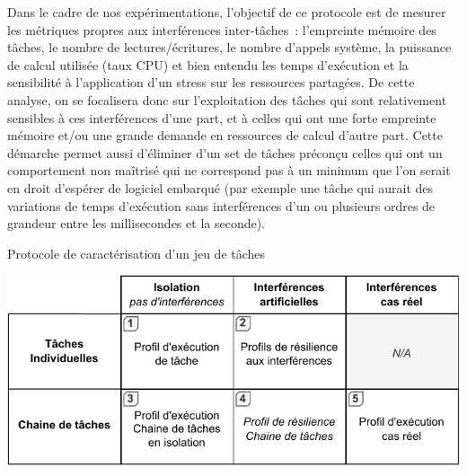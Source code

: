 \documentclass[french, a4paper, 11pt, twoside, pdftex]{StyleThese}
\begin{document}
        Dans le cadre de nos expérimentations, l'objectif de ce protocole est de mesurer les métriques propres aux interférences inter-tâches~: l'empreinte mémoire des tâches, le nombre de lectures/écritures, le nombre d'appels système, la puissance de calcul utilisée (taux CPU) et bien entendu les temps d'exécution et la sensibilité à l'application d'un stress sur les ressources partagées. De cette analyse, on se focalisera donc sur l'exploitation des tâches qui sont relativement sensibles à ces interférences d'une part, et à celles qui ont une forte empreinte mémoire et/ou une grande demande en ressources de calcul d'autre part. Cette démarche permet aussi d'éliminer d'un set de tâches préconçu celles qui ont un comportement non maîtrisé qui ne correspond pas à un minimum que l'on serait en droit d'espérer de logiciel embarqué (par exemple une tâche qui aurait des variations de temps d'exécution sans interférences d'un ou plusieurs ordres de grandeur entre les millisecondes et la seconde).
        
        \begin{table}[ht]
        	\centering
        	\caption{Protocole de caractérisation d'un jeu de tâches}
        	\label{tab:tableprotocoledesign}
        	\includegraphics[width=0.8\linewidth]{tables/Table_Protocole_Design}
        \end{table}
             
\end{document}
